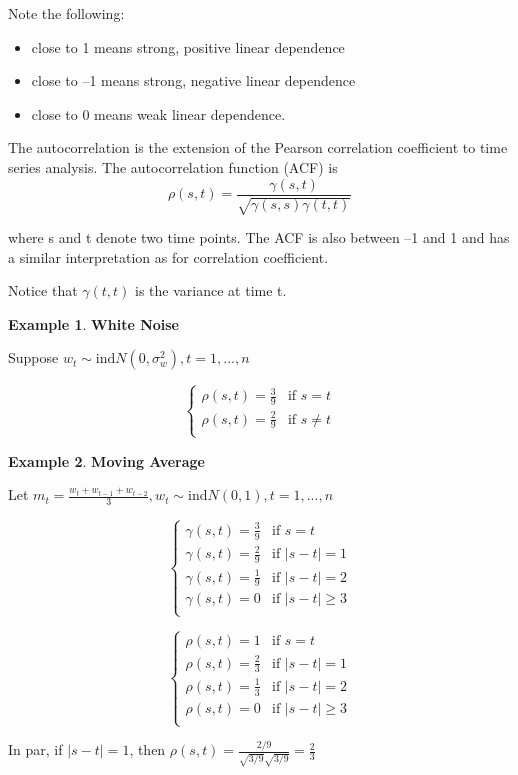 \documentclass[
]{book}
\providecommand{\tightlist}{%
  \setlength{\itemsep}{0pt}\setlength{\parskip}{0pt}}
\theoremstyle{definition}
\theoremstyle{definition}
\newtheorem{example}{Example}[chapter]
\theoremstyle{definition}
\theoremstyle{definition}
\theoremstyle{remark}
\begin{document}
Note the following:

\begin{itemize}
\tightlist
\item
  close to 1 means strong, positive linear dependence
\item
  close to --1 means strong, negative linear dependence
\item
  close to 0 means weak linear dependence.
\end{itemize}

The autocorrelation is the extension of the Pearson correlation coefficient to time series analysis. The autocorrelation function (ACF) is
\[\rho(s,t)=\frac{\gamma (s,t)}{\sqrt{\gamma (s,s)\gamma (t,t)}}\]

where s and t denote two time points. The ACF is also between --1 and 1 and has a similar interpretation as for correlation coefficient.

Notice that \(\gamma (t,t)\) is the variance at time t.

\begin{example}
\textbf{White Noise}

Suppose \(w_t\sim\mathrm{ind} N(0,\sigma^2_w), t=1,...,n\)

\[\begin{cases}
  \rho(s,t)= \frac{3}{9} & \text{if } s=t \\
  \rho(s,t)= \frac{2}{9} & \text{if } s\ne{t}\\
\end{cases}\]
\end{example}

\begin{example}
\textbf{Moving Average}

Let \(m_t=\frac{w_t+w_{t-1}+w_{t-2}}{3}, w_t\sim\mathrm{ind}N(0,1), t=1,...,n\)

\[\begin{cases}
  \gamma(s,t)= \frac{3}{9} & \text{if } s=t \\
  \gamma(s,t)= \frac{2}{9} & \text{if } |s-t|=1\\
  \gamma(s,t)= \frac{1}{9} & \text{if } |s-t|=2\\
  \gamma(s,t)= 0 & \text{if } |s-t|\ge 3\\
\end{cases}\]

\[\begin{cases}
  \rho(s,t)= 1 & \text{if } s=t \\
  \rho(s,t)= \frac{2}{3} & \text{if } |s-t|=1\\
  \rho(s,t)= \frac{1}{3} & \text{if } |s-t|=2\\
  \rho(s,t)= 0 & \text{if } |s-t|\ge 3\\
\end{cases}\]

In par, if \(|s-t|=1\), then \(\rho(s,t)=\frac{2/9}{\sqrt{3/9}\sqrt{3/9}}=\frac{2}{3}\)
\end{example}
\end{document}
